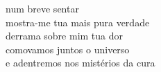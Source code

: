 num breve sentar\\
mostra-me tua mais pura verdade\\
derrama sobre mim tua dor\\
comovamos juntos o universo\\
e adentremos nos mistérios da cura
